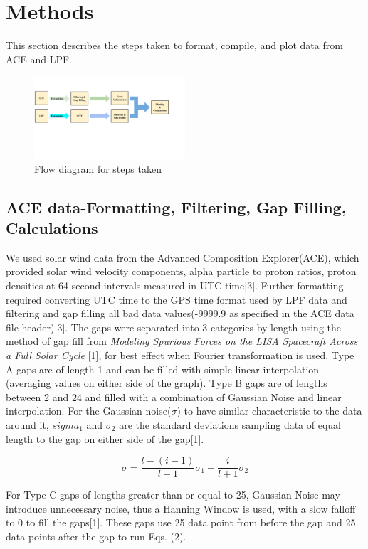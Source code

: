 \documentclass[%
 reprint,
 amsmath,amssymb,
 aps,
]{revtex4-2}
\begin{document}
\section{Methods}
This section describes the steps taken to format, compile, and plot data from ACE and LPF.
\begin{figure}[htbp]
\centerline{\includegraphics[width=0.5\textwidth]{fig1solWmam.jpg}}
\caption{Flow diagram for steps taken}
\label{fig}
\end{figure}
\subsection{ACE data-Formatting, Filtering, Gap Filling, Calculations
}
We used solar wind data from the Advanced Composition Explorer(ACE), which provided solar wind velocity components, alpha particle to proton ratios, proton densities at 64 second intervals measured in UTC time[3]. Further formatting required converting UTC time to the GPS time format used by LPF data and filtering and gap filling all bad data values(-9999.9 as specified in the ACE data file header)[3]. The gaps were separated into 3 categories by length using the method of gap fill from \textit{Modeling Spurious Forces on the LISA Spacecraft Across a Full Solar Cycle} [1], for best effect when Fourier transformation is used. Type A gaps are of length 1 and can be filled with simple linear interpolation (averaging values on either side of the graph). Type B gaps are of lengths between 2 and 24 and filled with a combination of Gaussian Noise and linear interpolation. For the Gaussian noise(\(\sigma\)) to have similar characteristic to the data around it, \(sigma_{1}\) and \(\sigma_{2}\) are the standard deviations sampling data of equal length to the gap on either side of the gap[1].

\begin{equation}\label{eq:Gaussian Window Equations}
\sigma=\frac{l-(i-1)}{l+1}\sigma_{1}+\frac{i}{l+1}\sigma_{2}
\end{equation}

For Type C gaps of lengths greater than or equal to 25, Gaussian Noise may introduce unnecessary noise, thus a Hanning Window is used, with a slow falloff to 0 to fill the gaps[1]. These gaps use 25 data point from before the gap and 25 data points after the gap to run Eqs. (2).
\end{document}
